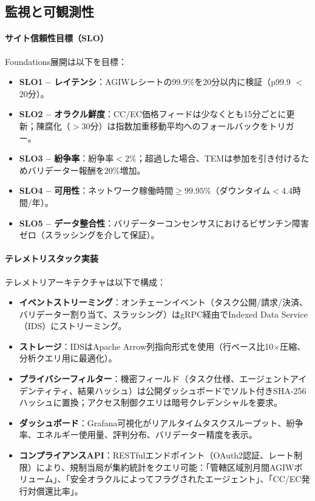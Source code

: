 \documentclass[11pt]{article}
\begin{document}
\subsection{監視と可観測性}
\paragraph{サイト信頼性目標（SLO）} Foundations展開は以下を目標：
\begin{itemize}[noitemsep]
  \item \textbf{SLO1 -- レイテンシ}：AGIWレシートの99.9\%を20分以内に検証（p99.9 $<$ 20分）。
  \item \textbf{SLO2 -- オラクル鮮度}：CC/EC価格フィードは少なくとも15分ごとに更新；陳腐化（$>30$分）は指数加重移動平均へのフォールバックをトリガー。
  \item \textbf{SLO3 -- 紛争率}：紛争率$<2\%$；超過した場合、TEMは参加を引き付けるためバリデーター報酬を20\%増加。
  \item \textbf{SLO4 -- 可用性}：ネットワーク稼働時間$\geq 99.95\%$（ダウンタイム$<4.4$時間/年）。
  \item \textbf{SLO5 -- データ整合性}：バリデーターコンセンサスにおけるビザンチン障害ゼロ（スラッシングを介して保証）。
\end{itemize}

\paragraph{テレメトリスタック実装} テレメトリアーキテクチャは以下で構成：
\begin{itemize}[noitemsep]
  \item \textbf{イベントストリーミング}：オンチェーンイベント（タスク公開/請求/決済、バリデーター割り当て、スラッシング）はgRPC経由でIndexed Data Service（IDS）にストリーミング。
  \item \textbf{ストレージ}：IDSはApache Arrow列指向形式を使用（行ベース比10$\times$圧縮、分析クエリ用に最適化）。
  \item \textbf{プライバシーフィルター}：機密フィールド（タスク仕様、エージェントアイデンティティ、結果ハッシュ）は公開ダッシュボードでソルト付きSHA-256ハッシュに置換；アクセス制御クエリは暗号クレデンシャルを要求。
  \item \textbf{ダッシュボード}：Grafana可視化がリアルタイムタスクスループット、紛争率、エネルギー使用量、評判分布、バリデーター精度を表示。
  \item \textbf{コンプライアンスAPI}：RESTfulエンドポイント（OAuth2認証、レート制限）により、規制当局が集約統計をクエリ可能：「管轄区域別月間AGIWボリューム」、「安全オラクルによってフラグされたエージェント」、「CC/EC発行対償還比率」。
\end{itemize}
\end{document}
